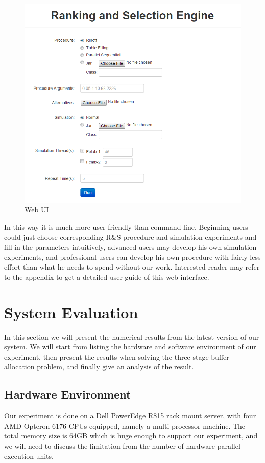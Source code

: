 \begin{figure}[ht] \label{web-ui}
\centering
\includegraphics[width=120mm]{rase_web.png}
\caption{Web UI}
\end{figure}

In this way it is much more user friendly than command line. Beginning users could just choose corresponding R\&S procedure and simulation experiments and fill in the parameters intuitively, advanced users may develop his own simulation experiments, and professional users can develop his own procedure with fairly less effort than what he needs to spend without our work. Interested reader may refer to the appendix to get a detailed user guide of this web interface.

\section{System Evaluation}

In this section we will present the numerical results from the latest version of our system. We will start from listing the hardware and software environment of our experiment, then present the results when solving the three-stage buffer allocation problem, and finally give an analysis of the result.

\subsection{Hardware Environment}

Our experiment is done on a Dell PowerEdge R815 rack mount server, with four AMD Opteron 6176 CPUs equipped, namely a multi-processor machine. The total memory size is 64GB which is huge enough to support our experiment, and we will need to discuss the limitation from the number of hardware parallel execution units.


